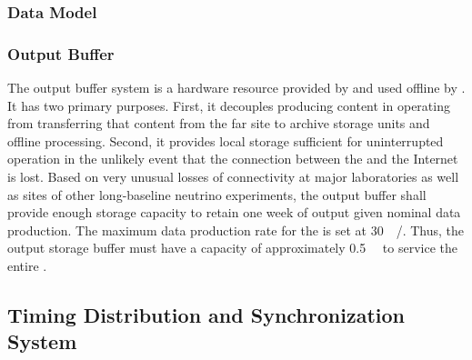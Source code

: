 \subsubsection{Data Model}
\label{sec:fd-daq:design-data-model}


\subsubsection{Output Buffer}


The output buffer system is a hardware resource provided by  and used offline by . 
It has two primary purposes. 
First, it decouples producing content in operating  from transferring that content from the far site to archive storage units and offline processing. 
Second, it provides local storage sufficient for uninterrupted  operation in the unlikely event that the connection between the  and the Internet is lost. 
Based on very unusual losses of connectivity at major laboratories as well as  sites of other long-baseline neutrino experiments, the output buffer shall provide enough storage capacity to retain one week of output given nominal data production. 
The maximum data production rate for the  is set at \SI{30}{\peta\byte/\year}. 
Thus, the output storage buffer must have a capacity of approximately \SI{0.5}{\peta\byte} to service the entire .




\subsection{Timing Distribution and Synchronization System}
\label{sec:sp-daq:design-timing}

